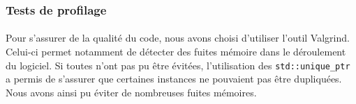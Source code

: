 \subsubsection{Tests de profilage}
\paragraph{}
Pour s'assurer de la qualité du code, nous avons choisi d'utiliser l'outil Valgrind. Celui-ci permet notamment de détecter des fuites mémoire dans le déroulement du logiciel. Si toutes n'ont pas pu être évitées, l'utilisation des \texttt{std::unique\_ptr} a permis de s'assurer que certaines instances ne pouvaient pas être dupliquées. Nous avons ainsi pu éviter de nombreuses fuites mémoires.


